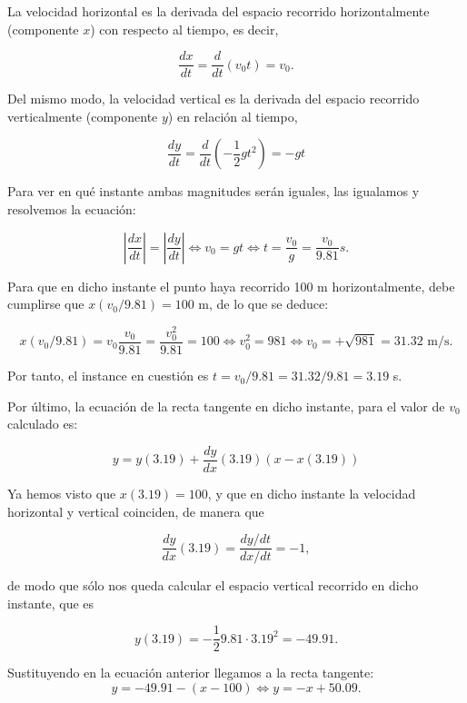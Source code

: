\documentclass[
  spanish,
  a4paper,
]{scrreport}
\theoremstyle{definition}
\theoremstyle{remark}
\begin{document}
\begin{tcolorbox}[enhanced jigsaw, arc=.35mm, bottomrule=.15mm, bottomtitle=1mm, breakable, colback=white, colbacktitle=quarto-callout-tip-color!10!white, colframe=quarto-callout-tip-color-frame, coltitle=black, left=2mm, leftrule=.75mm, opacityback=0, opacitybacktitle=0.6, rightrule=.15mm, title=\textcolor{quarto-callout-tip-color}{\faLightbulb}\hspace{0.5em}{Solución}, titlerule=0mm, toprule=.15mm, toptitle=1mm]

La velocidad horizontal es la derivada del espacio recorrido
horizontalmente (componente \(x\)) con respecto al tiempo, es decir,

\[
\frac{dx}{dt} = \frac{d}{dt}(v_0t)=v_0.
\]

Del mismo modo, la velocidad vertical es la derivada del espacio
recorrido verticalmente (componente \(y\)) en relación al tiempo,

\[
\frac{dy}{dt} = \frac{d}{dt}(-\frac{1}{2}gt^2)=-gt
\]

Para ver en qué instante ambas magnitudes serán iguales, las igualamos y
resolvemos la ecuación:

\[
|\frac{dx}{dt}|=|\frac{dy}{dt}| \Leftrightarrow v_0 = gt \Leftrightarrow t=\frac{v_0}{g}=\frac{v_0}{9.81} s.
\]

Para que en dicho instante el punto haya recorrido 100 m
horizontalmente, debe cumplirse que \(x(v_0/9.81)=100\) m, de lo que se
deduce:

\[
x(v_0/9.81)=v_0\frac{v_0}{9.81} = \frac{v_0^2}{9.81}=100 \Leftrightarrow v_0^2 = 981 \Leftrightarrow v_0 = +\sqrt{981}= 31.32 \mbox{ m/s}.
\]

Por tanto, el instance en cuestión es \(t=v_0/9.81= 31.32/9.81 = 3.19\)
s.

Por último, la ecuación de la recta tangente en dicho instante, para el
valor de \(v_0\) calculado es:

\[
y = y(3.19) + \frac{dy}{dx}(3.19) (x-x(3.19))
\]

Ya hemos visto que \(x(3.19)=100\), y que en dicho instante la velocidad
horizontal y vertical coinciden, de manera que

\[
\frac{dy}{dx}(3.19)=\frac{dy/dt}{dx/dt}=-1,
\]

de modo que sólo nos queda calcular el espacio vertical recorrido en
dicho instante, que es

\[
y(3.19)=-\frac{1}{2}9.81\cdot 3.19^2= -49.91.
\]

Sustituyendo en la ecuación anterior llegamos a la recta tangente: \[
y = -49.91-(x-100) \Leftrightarrow y=-x+50.09.
\]

\end{tcolorbox}
\end{document}
